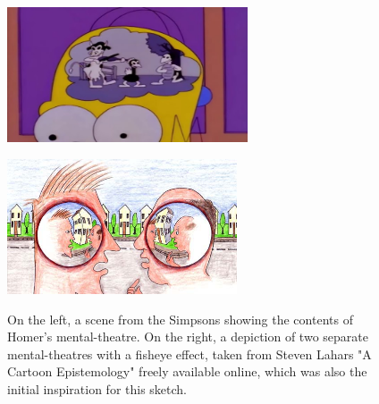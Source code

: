 \begin{figure}[h!]
    \centering
    \begin{minipage}[b]{0.4\textwidth}
        \centering
        \includegraphics[height=4cm]{figures/bubbles/homer}
        \label{fig:homer}
    \end{minipage}
    \hfill
    \begin{minipage}[b]{0.4\textwidth}
        \centering
        \includegraphics[height=4cm]{figures/bubbles/nestedminds}
        \label{fig:lehar}
    \end{minipage}
    \caption{On the left, a scene from the Simpsons showing the contents of Homer's mental-theatre. On the right, a depiction of two separate mental-theatres with a fisheye effect, taken from Steven Lahars "A Cartoon Epistemology" freely available online, which was also the initial inspiration for this sketch.}
    \label{fig:thinking}
\end{figure}

